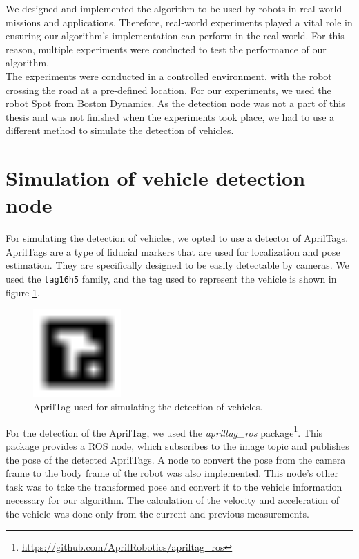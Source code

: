 We designed and implemented the algorithm to be used by robots in real-world missions and applications. Therefore, real-world experiments played a vital role in ensuring our algorithm's implementation can perform in the real world. For this reason, multiple experiments were conducted to test the performance of our algorithm.\\
The experiments were conducted in a controlled environment, with the robot crossing the road at a pre-defined location. For our experiments, we used the robot Spot from Boston Dynamics. As the detection node was not a part of this thesis and was not finished when the experiments took place, we had to use a different method to simulate the detection of vehicles.

\section{Simulation of vehicle detection node}
    For simulating the detection of vehicles, we opted to use a detector of AprilTags. AprilTags are a type of fiducial markers that are used for localization and pose estimation. They are specifically designed to be easily detectable by cameras. We used the \texttt{tag16h5} family, and the tag used to represent the vehicle is shown in figure \ref{fig:apriltag}.\\
    \begin{figure}[ht]
        \centering
        \includegraphics[trim={1 1 1 1}, clip, width=0.3\textwidth]{images/tag16_05_00007.png}
        \caption{AprilTag used for simulating the detection of vehicles.}
        \label{fig:apriltag}
    \end{figure}
    For the detection of the AprilTag, we used the \textit{apriltag\_ros} package\footnote{\url{https://github.com/AprilRobotics/apriltag_ros}}. This package provides a ROS node, which subscribes to the image topic and publishes the pose of the detected AprilTags. A node to convert the pose from the camera frame to the body frame of the robot was also implemented. This node's other task was to take the transformed pose and convert it to the vehicle information necessary for our algorithm. The calculation of the velocity and acceleration of the vehicle was done only from the current and previous measurements.


